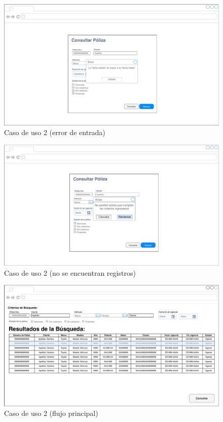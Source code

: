 \documentclass[12pt]{article}
\begin{document}
\vfill
\begin{figure}[h!]
\includegraphics[width=\textwidth]{CU2/CU-023.pdf}
\caption{Caso de uso 2 (error de entrada)}
\end{figure}
\vfill

\vfill
\begin{figure}[h!]
\includegraphics[width=\textwidth]{CU2/CU-025.pdf}
\caption{Caso de uso 2 (no se encuentran registros)}
\end{figure}
\vfill


\vfill
\begin{figure}[h!]
\includegraphics[width=\textwidth]{CU2/CU-024.pdf}
\caption{Caso de uso 2 (flujo principal)}
\end{figure}
\vfill
\end{document}
